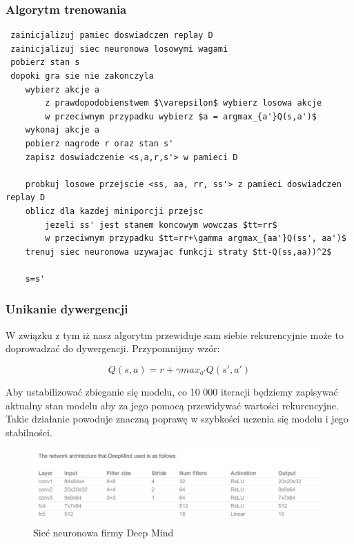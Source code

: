 \documentclass[12pt]{article}
\begin{document}
\subsubsection{Algorytm trenowania}

\begin{lstlisting}
 zainicjalizuj pamiec doswiadczen replay D
 zainicjalizuj siec neuronowa losowymi wagami
 pobierz stan s
 dopoki gra sie nie zakonczyla
	wybierz akcje a
		z prawdopodobienstwem $\varepsilon$ wybierz losowa akcje
		w przeciwnym przypadku wybierz $a = argmax_{a'}Q(s,a')$
	wykonaj akcje a
	pobierz nagrode r oraz stan s'
	zapisz doswiadczenie <s,a,r,s'> w pamieci D
	
	probkuj losowe przejscie <ss, aa, rr, ss'> z pamieci doswiadczen replay D
	oblicz dla kazdej miniporcji przejsc
		jezeli ss' jest stanem koncowym wowczas $tt=rr$
		w przeciwnym przypadku $tt=rr+\gamma argmax_{aa'}Q(ss', aa')$
	trenuj siec neuronowa uzywajac funkcji straty $tt-Q(ss,aa))^2$
	
	s=s'

\end{lstlisting}

\subsubsection{Unikanie dywergencji}

W związku z tym iż nasz algorytm przewiduje sam siebie rekurencyjnie może to doprowadzać do dywergencji. Przypomnijmy wzór: 

$$Q(s, a) = r + \gamma max_{a'}Q(s',a')$$

Aby ustabilizować zbieganie się modelu, co 10 000 iteracji będziemy zapisywać aktualny stan modelu aby za jego pomocą przewidywać wartości rekurencyjne. Takie działanie powoduje znaczną poprawę w szybkości uczenia się modelu i jego stabilności.

\begin{figure}[H]
\centering \includegraphics[scale=0.7]{deep_mind_architecture.PNG}
\caption{Sieć neuronowa firmy Deep Mind}
\label{simple1}
\end{figure}
\end{document}
